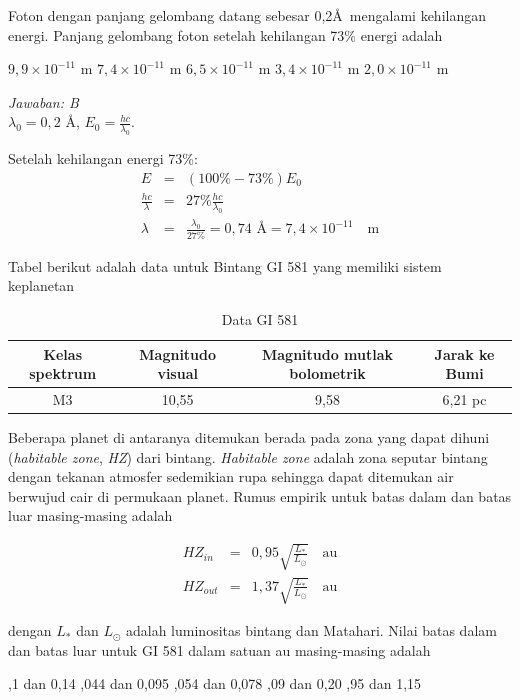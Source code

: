 \documentclass[11pt,fleqn]{exam}
\begin{document}
\begin{questions}
\vspace{0.3cm}
\question Foton dengan panjang gelombang datang sebesar 0,2\AA~mengalami kehilangan energi. Panjang gelombang foton setelah kehilangan 73\% energi adalah
\begin{choices}
\choice $9,9\times 10^{-11}$ m
\choice $7,4\times 10^{-11}$ m
\choice $6,5\times 10^{-11}$ m
\choice $3,4\times 10^{-11}$ m
\choice $2,0\times 10^{-11}$ m
\end{choices}

\textit{Jawaban: B} \\
$\lambda_0=0,2$ \AA, $E_0=\frac{hc}{\lambda_0}$. 

Setelah kehilangan energi 73\%: 
\begin{eqnarray*}
E &=& (100\%-73\%)E_0\\
\frac{hc}{\lambda} &=& 27\% \frac{hc}{\lambda_0}\\
\lambda &=& \frac{\lambda_0}{27\%} = 0,74 \text{ \AA} = 7,4\times 10^{-11} \quad \text{m}
\end{eqnarray*}


\vspace{0.3cm}
\question Tabel berikut adalah data untuk Bintang GI 581 yang memiliki sistem keplanetan

\begin{table}[h!]
\centering
\caption*{Data GI 581}
\begin{tabular}{|c|c|c|c|}
\hline
Kelas spektrum & Magnitudo visual & Magnitudo mutlak bolometrik & Jarak ke Bumi \\
\hline
M3 & 10,55 & 9,58 & 6,21 pc \\
\hline
\end{tabular}
\end{table}

Beberapa planet di antaranya ditemukan berada pada zona yang dapat dihuni (\textit{habitable zone}, \textit{HZ}) dari bintang. \textit{Habitable zone} adalah zona seputar bintang dengan tekanan atmosfer sedemikian rupa sehingga dapat ditemukan air berwujud cair di permukaan planet. Rumus empirik untuk batas dalam dan batas luar masing-masing adalah

\begin{eqnarray*}
HZ_{in} &=& 0,95\sqrt{\frac{L_*}{L_{\odot}}} \quad \text{au} \\
HZ_{out} &=& 1,37\sqrt{\frac{L_*}{L_{\odot}}} \quad \text{au}
\end{eqnarray*}

dengan $L_*$ dan $L_{\odot}$ adalah luminositas bintang dan Matahari. Nilai batas dalam dan batas luar untuk GI 581 dalam satuan au masing-masing adalah
\begin{choices}
,1 dan 0,14
,044 dan 0,095
,054 dan 0,078
,09 dan 0,20
,95 dan 1,15
\end{choices}


\end{questions}
\end{document}
